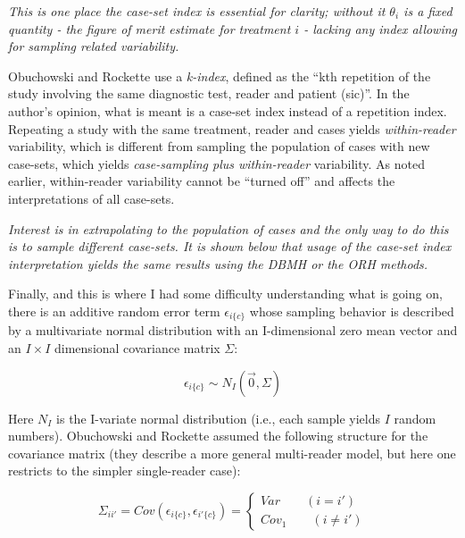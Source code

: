 \documentclass[
]{book}
\begin{document}
\emph{This is one place the case-set index is essential for clarity; without it \(\theta_i\) is a fixed quantity - the figure of merit estimate for treatment \(i\) - lacking any index allowing for sampling related variability.}

Obuchowski and Rockette use a \emph{k-index}, defined as the ``kth repetition of the study involving the same diagnostic test, reader and patient (sic)''. In the author's opinion, what is meant is a case-set index instead of a repetition index. Repeating a study with the same treatment, reader and cases yields \emph{within-reader} variability, which is different from sampling the population of cases with new case-sets, which yields \emph{case-sampling plus within-reader} variability. As noted earlier, within-reader variability cannot be ``turned off'' and affects the interpretations of all case-sets.

\emph{Interest is in extrapolating to the population of cases and the only way to do this is to sample different case-sets. It is shown below that usage of the case-set index interpretation yields the same results using the DBMH or the ORH methods.}

Finally, and this is where I had some difficulty understanding what is going on, there is an additive random error term \(\epsilon_{i\{c\}}\) whose sampling behavior is described by a multivariate normal distribution with an I-dimensional zero mean vector and an \(I \times I\) dimensional covariance matrix \(\Sigma\):

\begin{equation}
\epsilon_{i\{c\}} \sim N_I\left ( \vec{0} ,  \Sigma\right )
\label{eq:DefinitionEpsilon}
\end{equation}

Here \(N_I\) is the I-variate normal distribution (i.e., each sample yields \(I\) random numbers). Obuchowski and Rockette assumed the following structure for the covariance matrix (they describe a more general multi-reader model, but here one restricts to the simpler single-reader case):

\begin{equation}
\Sigma_{ii'}=Cov\left ( \epsilon_{i\{c\}}, \epsilon_{i'\{c\}} \right )=\left\{\begin{matrix}
Var \qquad (i=i')\\ 
Cov_1 \qquad (i\neq i')
\end{matrix}\right.
\label{eq:DefinitionSigma}
\end{equation}
\end{document}
